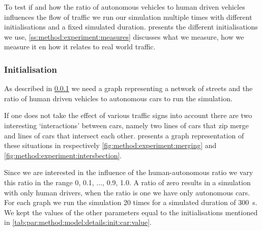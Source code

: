 To test if and how the ratio of autonomous vehicles to human driven vehicles influences the flow of traffic we run our simulation multiple times with different initialisations and a fixed simulated duration.  presents the different initialisations we use, \cref{ss:method:experiment:measures} discusses what we measure, how we measure it en how it relates to real world traffic. 

\subsubsection{Initialisation}
\label{ss:method:experiment:init}
As described in \cref{ss:method:experiment:init} we need a graph representing a network of streets and the ratio of human driven vehicles to autonomous cars to run the simulation. 

If one does not take the effect of various traffic signs into account there are two interesting `interactions' between cars, namely two lines of cars that zip merge and lines of cars that intersect each other.  presents a graph representation of these situations in respectively \cref{fig:method:experiment:merging} and \cref{fig:method:experiment:intersbection}.

Since we are interested in the influence of the human-autonomous ratio we vary this ratio in the range 0, 0.1, $\dotsc$, 0.9, 1.0. A ratio of zero results in a simulation with only human drivers, when the ratio is one we have only autonomous cars. For each graph we run the simulation 20 times for a simulated duration of \SI{300}{\second}. We kept the values of the other parameters equal to the initialisations mentioned in \cref{tab:par:method:model:details:init:car:value}.

